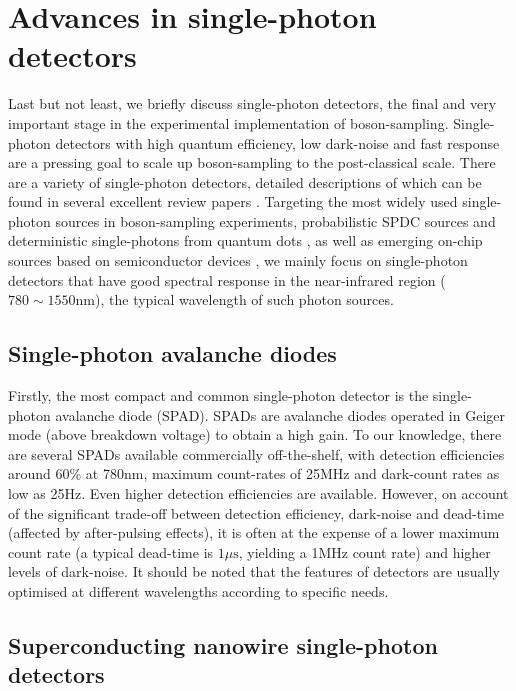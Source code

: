 \documentclass[aps,rmp,twocolumn,amsmath,amssymb,nofootinbib,superscriptaddress]{revtex4}
\begin{document}
\section{Advances in single-photon detectors} \label{sec:adv_detectors}

Last but not least, we briefly discuss single-photon detectors, the final and very important stage in the experimental implementation of boson-sampling. Single-photon detectors with high quantum efficiency, low dark-noise and fast response are a pressing goal to scale up boson-sampling to the post-classical scale. There are a variety of single-photon detectors, detailed descriptions of which can be found in several excellent review papers \cite{bib:53, bib:86}. Targeting the most widely used single-photon sources in boson-sampling experiments, probabilistic SPDC sources and deterministic single-photons from quantum dots \cite{bib:11}, as well as emerging on-chip sources based on semiconductor devices \cite{bib:43, bib:44}, we mainly focus on single-photon detectors that have good spectral response in the near-infrared region ($780\sim 1550$nm), the typical wavelength of such photon sources.

\subsection{Single-photon avalanche diodes}

Firstly, the most compact and common single-photon detector is the single-photon avalanche diode (SPAD). SPADs are avalanche diodes operated in Geiger mode (above breakdown voltage) to obtain a high gain. To our knowledge, there are several SPADs available commercially off-the-shelf, with detection efficiencies around 60\% at 780nm, maximum count-rates of 25MHz and dark-count rates as low as 25Hz. Even higher detection efficiencies are available. However, on account of the significant trade-off between detection efficiency, dark-noise and dead-time (affected by after-pulsing effects), it is often at the expense of a lower maximum count rate (a typical dead-time is $1\mu\mathrm{s}$, yielding a 1MHz count rate) and higher levels of dark-noise. It should be noted that the features of detectors are usually optimised at different wavelengths according to specific needs.

\subsection{Superconducting nanowire single-photon detectors}
\end{document}

